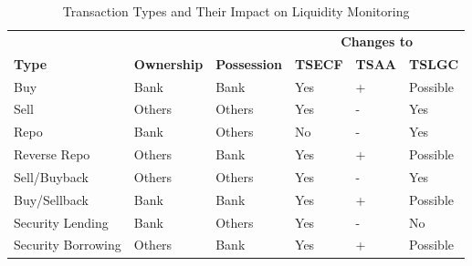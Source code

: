 \begin{table}[h]
    \centering
    \caption{Transaction Types and Their Impact on Liquidity Monitoring}
    \label{tab:transactions}
    \begin{tabular}{l|l|l|l|l|l}
    \toprule
    & & & \multicolumn{3}{c}{\textbf{Changes to}} \\
    \textbf{Type} & \textbf{Ownership} & \textbf{Possession} & \textbf{TSECF} & \textbf{TSAA} & \textbf{TSLGC} \\
    \midrule
    Buy & Bank & Bank & Yes & + & Possible \\
    Sell & Others & Others & Yes & - & Yes \\
    Repo & Bank & Others & No & - & Yes \\
    Reverse Repo & Others & Bank & Yes & + & Possible \\
    Sell/Buyback & Others & Others & Yes & - & Yes \\
    Buy/Sellback & Bank & Bank & Yes & + & Possible \\
    Security Lending & Bank & Others & Yes & - & No \\
    Security Borrowing & Others & Bank & Yes & + & Possible \\
    \bottomrule
    \end{tabular}
    \end{table}




